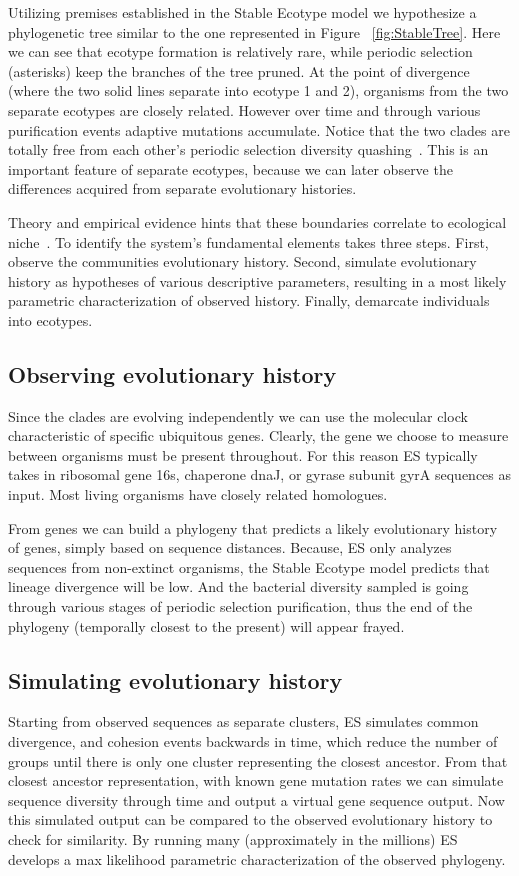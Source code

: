 Utilizing premises established in the Stable Ecotype model we hypothesize a phylogenetic tree similar to the one represented in Figure ~\ref{fig:StableTree}.
Here we can see that ecotype formation is relatively rare, while periodic selection (asterisks) keep the branches of the tree pruned.
At the point of divergence (where the two solid lines separate into ecotype 1 and 2), organisms from the two separate ecotypes are closely related.
However over time and through various purification events adaptive mutations accumulate.
Notice that the two clades are totally free from each other's periodic selection diversity quashing~\cite{cohan2007systematics}.
This is an important feature of separate ecotypes, because we can later observe the differences acquired from separate evolutionary histories.

Theory and empirical evidence hints that these boundaries correlate to ecological niche~\cite{cohan2007systematics, cohan2006sequence, ward2006cyanobacterial, cohan2006toward}.
To identify the system's fundamental elements takes three steps.
First, observe the communities evolutionary history.
Second, simulate evolutionary history as hypotheses of various descriptive parameters, resulting in a most likely parametric characterization of observed history.
Finally, demarcate individuals into ecotypes.

\subsection*{Observing evolutionary history}
Since the clades are evolving independently we can use the molecular clock characteristic of specific ubiquitous genes.
Clearly, the gene we choose to measure between organisms must be present throughout.
For this reason ES typically takes in ribosomal gene 16s, chaperone dnaJ, or gyrase subunit gyrA sequences  as input. Most living organisms have closely related homologues.

From genes we can build a phylogeny that predicts a likely evolutionary history of genes, simply based on sequence distances.
Because, ES only analyzes sequences from non-extinct organisms, the Stable Ecotype model predicts that lineage divergence will be low.
And the bacterial diversity sampled is going through various stages of periodic selection purification, thus the end of the phylogeny (temporally closest to the present) will appear frayed.

\subsection*{Simulating evolutionary history}
Starting from observed sequences as separate clusters, ES simulates common divergence, and cohesion events backwards in time, which reduce the number of groups until there is only one cluster representing the closest ancestor.
From that closest ancestor representation, with known gene mutation rates we can simulate sequence diversity through time and output a virtual gene sequence output.
Now this simulated output can be compared to the observed evolutionary history to check for similarity.
By running many (approximately in the millions) ES develops a max likelihood parametric characterization of the observed phylogeny. 


